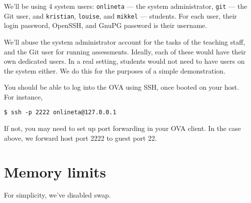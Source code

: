 

We'll be using 4 system users: \texttt{onlineta} --- the system administrator,
\texttt{git} --- the Git user, and \texttt{kristian}, \texttt{louise}, and
\texttt{mikkel} --- students. For each user, their login password, OpenSSH, and
GnuPG password is their username.

We'll abuse the system administrator account for the tasks of the teaching
staff, and the Git user for running assessments. Ideally, each of these would
have their own dedicated users. In a real setting, students would not need to
have users on the system either. We do this for the purposes of a simple
demonstration.

You should be able to log into the OVA using SSH, once booted on your host.
For instance,

\begin{lstlisting}
$ ssh -p 2222 onlineta@127.0.0.1
\end{lstlisting}

If not, you may need to set up port forwarding in your OVA client. In the case
above, we forward host port 2222 to guest port 22.

\section{Memory limits}

For simplicity, we've disabled swap.


